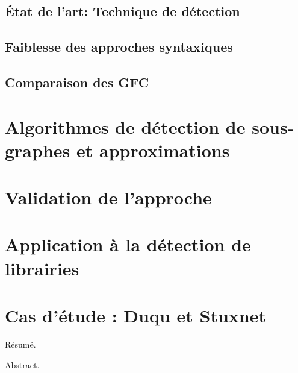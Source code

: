 \documentclass[12pt, oneside]{TUL/thesul}
\begin{document}
\section{État de l'art: Technique de détection}
\section{Faiblesse des approches syntaxiques}
\section{Comparaison des GFC}

\DontFrameThisInToc
\chapter{Algorithmes de détection de sous-graphes et approximations}

\DontFrameThisInToc
\chapter{Validation de l'approche}

\DontFrameThisInToc
\chapter{Application à la détection de librairies}

\DontFrameThisInToc
\chapter{Cas d'étude : Duqu et Stuxnet}

\PutLineInToc

\PrintIndex

\onecolumn



\nocite{*}
% 
% 
% 
\printbibliography

\NumberAbstractPages
\begin{ThesisAbstract}
  \begin{FrenchAbstract}
    Résumé.
  \end{FrenchAbstract}
  \begin{EnglishAbstract}
    Abstract.
  \end{EnglishAbstract}
\end{ThesisAbstract}
\end{document}
